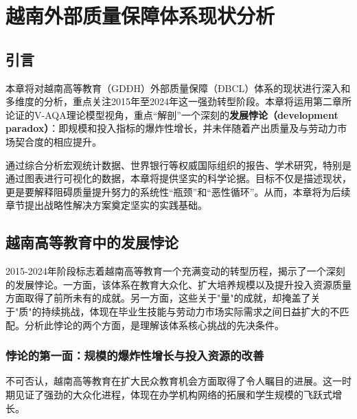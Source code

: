 
\chapter{越南外部质量保障体系现状分析}
\label{chap:thuc_trang}

\section*{引言}

本章将对越南高等教育（GDĐH）外部质量保障（ĐBCL）体系的现状进行深入和多维度的分析，重点关注2015年至2024年这一强劲转型阶段。本章将运用第二章所论证的V-AQA理论模型视角，重点“解剖”一个深刻的\textbf{发展悖论（development paradox）}：即规模和投入指标的爆炸性增长，并未伴随着产出质量及与劳动力市场契合度的相应提升。

通过综合分析宏观统计数据、世界银行等权威国际组织的报告、学术研究，特别是通过图表进行可视化的数据，本章将提供坚实的科学论据。目标不仅是描述现状，更是要解释阻碍质量提升努力的系统性“瓶颈”和“恶性循环”。从而，本章将为后续章节提出战略性解决方案奠定坚实的实践基础。

\section{越南高等教育中的发展悖论}
\label{sec:nghich_ly_phat_trien_vimo}

2015-2024年阶段标志着越南高等教育一个充满变动的转型历程，揭示了一个深刻的发展悖论。一方面，该体系在教育大众化、扩大培养规模以及提升投入资源质量方面取得了前所未有的成就。另一方面，这些关于"量"的成就，却掩盖了关于"质"的持续挑战，体现在毕业生技能与劳动力市场实际需求之间日益扩大的不匹配。分析此悖论的两个方面，是理解该体系核心挑战的先决条件。

\subsection{悖论的第一面：规模的爆炸性增长与投入资源的改善}
\label{subsec:ve_thu_nhat_nghich_ly}

不可否认，越南高等教育在扩大民众教育机会方面取得了令人瞩目的进展。这一时期见证了强劲的大众化进程，体现在办学机构网络的拓展和学生规模的飞跃式增长。

